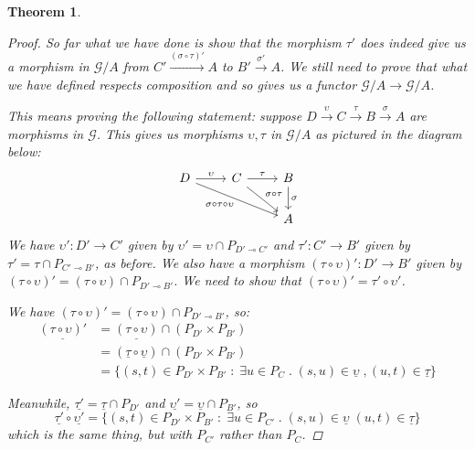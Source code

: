 \documentclass[11pt]{article} %
\theoremstyle{plain} %
\newtheorem{theorem}{Theorem}[section]
\theoremstyle{definition} %
\theoremstyle{exercisestyle}
\newcommand{\map}[3]{#2\xrightarrow{#1} #3}
\newcommand*\from{\colon}
\newcommand{\cmap}[3]{#1\from{}#2\to{}#3}
\renewcommand{\implies}{\multimap}
\newcommand{\comp}[2]{#1 \circ #2}
\newcommand{\G}{\mathcal G}
\newcommand{\suchthat}{\;\colon\;}
\newcommand{\esuchthat}{\;.\;}
\newcommand{\grel}[1]{\underline{#1}}
\begin{document}
\begin{theorem}
\begin{proof}
     So far what we have done is show that the morphism $\tau'$ does indeed give us a morphism in $\G/A$ from $\map{(\comp\sigma\tau)'}{C'}{A}$ to $\map{\sigma'}{B'}{A}$.  We still need to prove that what we have defined respects composition and so gives us a functor $\G/A\to \G/A$.

     This means proving the following statement: suppose $\map{\upsilon}{D}{C}\xrightarrow{\tau}\map{\sigma}{B}{A}$ are morphisms in $\G$.  This gives us morphisms $\upsilon,\tau$ in $\G/A$ as pictured in the diagram below:
    \[
      \begin{tikzcd}
        D \arrow[r, "\upsilon"] \arrow[drr, "\comp{\sigma}{\comp{\tau}{\upsilon}}"']
          & C \arrow[r, "\tau"] \arrow[dr, "\comp\sigma\tau"]
            & B \arrow[d, "\sigma"] \\
          &
            & A
      \end{tikzcd}
      \]
    We have $\cmap{\upsilon'}{D'}{C'}$ given by $\upsilon'=\upsilon\cap P_{D'\implies C'}$ and $\cmap{\tau'}{C'}{B'}$ given by $\tau'=\tau\cap P_{C'\implies B'}$, as before.  We also have a morphism $\cmap{(\comp\tau\upsilon)'}{D'}{B'}$ given by $(\comp\tau\upsilon)'=(\comp\tau\upsilon)\cap P_{D'\implies B'}$.  We need to show that $(\comp\tau\upsilon)'=\comp{\tau'}{\upsilon'}$.

    We have $(\comp\tau\upsilon)'=(\comp\tau\upsilon)\cap P_{D'\implies B'}$, so:
    \begin{align*}
      \grel{(\comp\tau\upsilon)'} & = \grel{(\comp\tau\upsilon)}\cap(P_{D'}\times P_{B'}) \\
       & = (\comp{\grel\tau}{\grel\upsilon}) \cap (P_{D'}\times P_{B'}) \\
       & = \{(s,t)\in P_{D'}\times P_{B'} \suchthat \exists u\in P_C \esuchthat (s,u) \in \grel\upsilon\;, (u,t) \in \grel\tau \}
    \end{align*}

    Meanwhile, $\grel{\tau '} = \grel\tau \cap P_{D'}$ and $\grel{\upsilon '} = \grel\upsilon \cap P_{B'}$, so
    \[
      \comp{\grel{\tau '}}{\grel{\upsilon '}} = \{(s,t) \in P_{D'}\times P_{B'} \suchthat \exists u\in P_{C'} \esuchthat (s,u) \in \grel\upsilon\; (u,t)\in \grel\tau \}
      \]
    which is the same thing, but with $P_{C'}$ rather than $P_C$.  


\end{proof}
\end{theorem}
\end{document}
